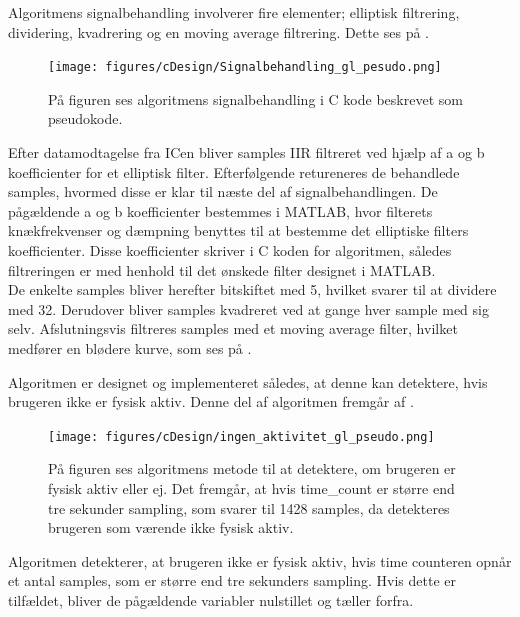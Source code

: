 Algoritmens signalbehandling involverer fire elementer; elliptisk filtrering, dividering, kvadrering og en moving average filtrering. Dette ses på .
\begin{figure}[H]
	\centering
	\texttt{[image: figures/cDesign/Signalbehandling\_gl\_pesudo.png]}
	\caption{På figuren ses algoritmens signalbehandling i C kode beskrevet som pseudokode.}
	\label{fig:signalbehandling_g_l}
\end{figure} \vspace{-0.5cm}
Efter datamodtagelse fra ICen bliver samples IIR filtreret ved hjælp af a og b koefficienter for et elliptisk filter. Efterfølgende retureneres de behandlede samples, hvormed disse er klar til næste del af signalbehandlingen. De pågældende a og b koefficienter bestemmes i MATLAB, hvor filterets knækfrekvenser og dæmpning benyttes til at bestemme det elliptiske filters koefficienter. Disse koefficienter skriver i C koden for algoritmen, således filtreringen er med henhold til det ønskede filter designet i MATLAB.\\
De enkelte samples bliver herefter bitskiftet med 5, hvilket svarer til at dividere med 32. Derudover bliver samples kvadreret ved at gange hver sample med sig selv. Afslutningsvis filtreres samples med et moving average filter, hvilket medfører en blødere kurve, som ses på .

Algoritmen er designet og implementeret således, at denne kan detektere, hvis brugeren ikke er fysisk aktiv. Denne del af algoritmen fremgår af .
\begin{figure}[H]
	\centering
	\texttt{[image: figures/cDesign/ingen\_aktivitet\_gl\_pseudo.png]}
	\caption{På figuren ses algoritmens metode til at detektere, om brugeren er fysisk aktiv eller ej. Det fremgår, at hvis time\_count er større end tre sekunder sampling, som svarer til 1428 samples, da detekteres brugeren som værende ikke fysisk aktiv.}
	\label{fig:ingen_ak_pseudo}
\end{figure} \vspace{-0.5cm}
Algoritmen detekterer, at brugeren ikke er fysisk aktiv, hvis time counteren opnår et antal samples, som er større end tre sekunders sampling. Hvis dette er tilfældet, bliver de pågældende variabler nulstillet og tæller forfra.

